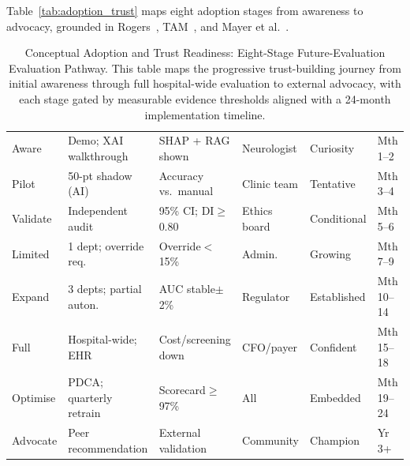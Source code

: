 \noindent Table~\ref{tab:adoption_trust} maps eight adoption stages from awareness to advocacy, grounded in Rogers~\cite{rogers2003diffusion}, TAM~\cite{davis1989tam}, and Mayer et al.~\cite{mayer1995trust}.



\begin{table}[!htbp]
\tablestripes\tablefontsize
\caption[Conceptual Adoption and Trust Readiness: Eight-Stage Future-Evaluation]{Conceptual Adoption and Trust Readiness: Eight-Stage Future-Evaluation Evaluation Pathway. This table maps the progressive trust-building journey from initial awareness through full hospital-wide evaluation to external advocacy, with each stage gated by measurable evidence thresholds aligned with a 24-month implementation timeline.}
\tablefontsize
\begin{tabularx}{\textwidth}{@{} >{\raggedright\arraybackslash}p{1.1cm} L L L L >{\raggedright\arraybackslash}p{1.0cm} @{}}
\toprule
{} &  &  &  &  &  \\
\midrule
Aware & Demo; XAI walkthrough & SHAP + RAG shown & Neurologist & Curiosity & Mth 1--2 \\
\addlinespace
Pilot & 50-pt shadow (AI) & Accuracy vs.\ manual & Clinic team & Tentative & Mth 3--4 \\
\addlinespace
Validate & Independent audit & 95\% CI; DI$\geq$0.80 & Ethics board & Conditional & Mth 5--6 \\
\addlinespace
Limited & 1 dept; override req. & Override$<$15\% & Admin. & Growing & Mth 7--9 \\
\addlinespace
Expand & 3 depts; partial auton. & AUC stable$\pm$2\% & Regulator & Established & Mth 10--14 \\
\addlinespace
Full & Hospital-wide; EHR & Cost/screening down & CFO/payer & Confident & Mth 15--18 \\
\addlinespace
Optimise & PDCA; quarterly retrain & Scorecard$\geq$97\% & All & Embedded & Mth 19--24 \\
\addlinespace
Advocate & Peer recommendation & External validation & Community & Champion & Yr 3+ \\
\bottomrule
\end{tabularx}
\end{table}

